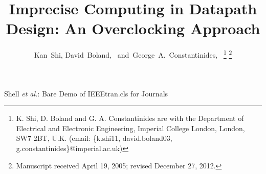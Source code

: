 \documentclass[journal]{IEEEtran}
\begin{document}
\title{Imprecise Computing in Datapath Design: An Overclocking Approach}

\author{Kan~Shi,
        David~Boland,~
        and~George~A.~Constantinides,~%
	\thanks{K. Shi, D. Boland and G. A. Constantinides are with the Department of Electrical and Electronic Engineering, Imperial College London, London, SW7 2BT, U.K. (email: \{k.shi11, david.boland03, g.constantinides\}@imperial.ac.uk)}%
\thanks{Manuscript received April 19, 2005; revised December 27, 2012.}}

%
%



%
{Shell \MakeLowercase{\textit{et al.}}: Bare Demo of IEEEtran.cls for Journals}

\maketitle
\end{document}
